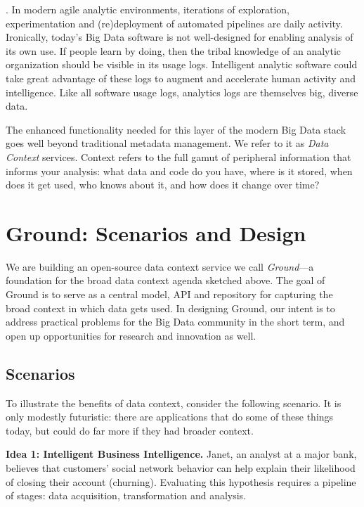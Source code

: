 \documentclass{sig-alternate}
\begin{document}
. In modern agile analytic environments, iterations of exploration, experimentation and (re)deployment of automated pipelines are daily activity. Ironically, today's Big Data software is not well-designed for enabling analysis of its own use. If people learn by doing, then the tribal knowledge of an analytic organization should be visible in its usage logs. Intelligent analytic software could take great advantage of these logs to augment and accelerate human activity and intelligence. Like all software usage logs, analytics logs are themselves big, diverse data.

\smallitembot
The enhanced functionality needed for this layer of the modern Big Data stack goes well beyond traditional metadata management. We refer to it as \emph{Data Context} services. Context refers to the full gamut of peripheral information that informs your analysis: what data and code do you have, where is it stored, when does it get used, who knows about it, and how does it change over time?  

\section{Ground: Scenarios and Design}
We are building an open-source data context service we call \emph{Ground}---a foundation for the broad data context agenda sketched above. 
The goal of Ground is to serve as a central model, API and repository for capturing the broad context in which data gets used. In designing Ground, our intent is to address practical problems for the Big Data community in the short term, and open up opportunities for research and innovation as well.

\subsection{Scenarios}
To illustrate the benefits of data context, consider the following scenario. It is only modestly futuristic: there are applications that do some of these things today, but could do far more if they had broader context.

\textbf{Idea 1: Intelligent Business Intelligence.}  Janet, an analyst at a major bank, believes that customers' social network behavior can help explain their likelihood of closing their account (churning). Evaluating this hypothesis requires a pipeline of stages: data acquisition, transformation and analysis. 
\end{document}
